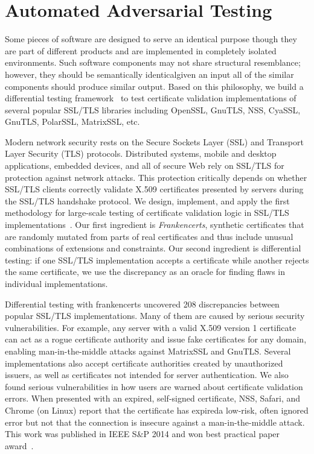 \documentclass[a4paper, 11pt]{article}
\begin{document}
\begin{small}
\begin{itemize}
\end{itemize}


\section*{\large Automated Adversarial Testing}

Some pieces of software are designed to serve an identical purpose though they are part of
different products and are implemented in completely isolated environments. Such software
components may not share structural resemblance; however, they should be semantically
identical\textemdash given an input all of the similar components should produce similar
output.  Based on this philosophy, we build a differential testing
framework~\cite{KeemanDifferentialTesting1998} to test certificate validation implementations
of several popular SSL/TLS libraries including OpenSSL, GnuTLS, NSS, CyaSSL, GnuTLS, PolarSSL,
MatrixSSL, etc.

Modern network security rests on the Secure Sockets Layer (SSL) and Transport Layer Security
(TLS) protocols.  Distributed systems, mobile and desktop applications, embedded devices, and
all of secure Web rely on SSL/TLS for protection against network attacks.  This protection
critically depends on whether SSL/TLS clients correctly validate X.509 certificates presented
by servers during the SSL/TLS handshake protocol.  We design, implement, and apply the first
methodology for large-scale testing of certificate validation logic in SSL/TLS
implementations~\cite{brubaker2014using}.  Our first ingredient is {\em Frankencerts},
synthetic certificates that are randomly mutated from parts of real certificates and thus
include unusual combinations of extensions and constraints.  Our second ingredient is
differential testing: if one SSL/TLS implementation accepts a certificate while another rejects
the same certificate, we use the discrepancy as an oracle for finding flaws in individual
implementations.


Differential testing with frankencerts uncovered 208 discrepancies between popular SSL/TLS
implementations. Many of them are caused by serious security vulnerabilities.  For example, any
server with a valid X.509 version 1 certificate can act as a rogue certificate authority and
issue fake certificates for any domain, enabling man-in-the-middle attacks against MatrixSSL
and GnuTLS.  Several implementations also accept certificate authorities created by
unauthorized issuers, as well as certificates not intended for server authentication. We also
found serious vulnerabilities in how users are warned about certificate validation errors.
When presented with an expired, self-signed certificate, NSS, Safari, and Chrome (on Linux)
report that the certificate has expired\textemdash a low-risk, often ignored error\textemdash
but not that the connection is insecure against a man-in-the-middle attack. This work was
published in IEEE S\&P 2014 and won best practical paper award~\cite{brubaker2014using}.


\end{small}
\end{document}
